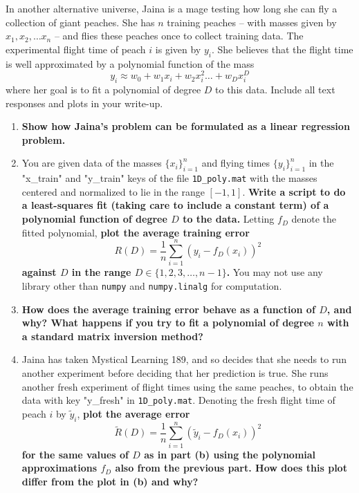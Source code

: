 \documentclass{article}\usepackage[utf8]{inputenc}\usepackage[margin=0.4cm,top=0.4cm,bottom=0.4cm]{geometry}\usepackage[usenames,dvipsnames,svgnames,table]{xcolor}
\begin{document}
\noindent In another alternative universe, Jaina is a mage testing how long she can fly a collection of giant peaches. She has $n$ training peaches -- with masses given by $x_1, x_2, \ldots x_n$ -- and flies these peaches once to collect training data. The experimental flight time of peach $i$ is given by $y_i$. She believes that the flight time is well approximated by a polynomial function of the mass $$y_i \approx w_0 + w_1x_i + w_2x_i^2 \dots + w_Dx_i^D$$ where her goal is to fit a polynomial of degree $D$ to this data. Include all text responses and plots in your write-up.
\begin{enumerate}
\item \textbf{Show how Jaina's problem can be formulated as a linear regression problem.}
\BeginSolution

\EndSolution
\item You are given data of the masses $\{x_i\}_{i=1}^n$ and flying times $\{y_i\}_{i=1}^n$ in the "x\_train" and "y\_train" keys of the file \texttt{1D\_poly.mat} with the masses centered and normalized to lie in the range $[-1, 1]$. \textbf{Write a script to do a least-squares fit (taking care to include a constant term) of a polynomial function of degree $D$ to the data.} Letting $f_D$ denote the fitted polynomial, \textbf{plot the average training error $$R(D) = \frac{1}{n} \sum_{i=1}^n (y_i - f_D(x_i))^2$$ against $D$ in the range $D \in \{1, 2, 3, \ldots, n-1\}$.}  You may not use any library other than \texttt{numpy} and \texttt{numpy.linalg} for computation.
\BeginSolution

\EndSolution
\item \textbf{How does the average training error behave as a function of $D$, and why? What happens if you try to fit a polynomial of degree $n$ with a standard matrix inversion method?}
\BeginSolution

\EndSolution
\item Jaina has taken Mystical Learning 189, and so decides that she needs to run another experiment before deciding that her prediction is true. She runs another fresh experiment of flight times using the same peaches, to obtain the data with key "y\_fresh" in \texttt{1D\_poly.mat}. Denoting the fresh flight time of peach $i$ by $\tilde{y}_i$, \textbf{plot the average error $$\tilde{R}(D) = \frac{1}{n} \sum_{i=1}^n (\tilde{y}_i - f_D(x_i))^2$$ for the same values of $D$ as in part (b) using the polynomial approximations $f_D$ also from the previous part. How does this plot differ from the plot in (b) and why?}
\BeginSolution


\end{enumerate}
\end{document}
